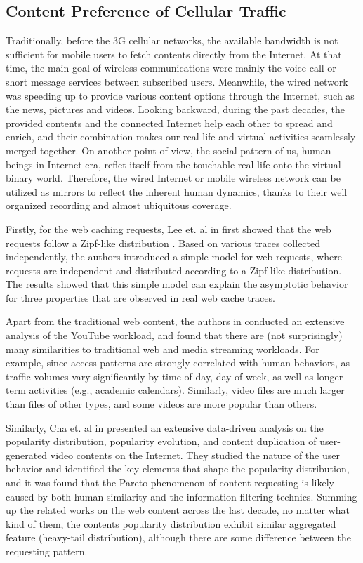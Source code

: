 \subsection{Content Preference of Cellular Traffic}
Traditionally, before the 3G cellular networks, the available bandwidth is not sufficient for mobile users to fetch contents directly from the Internet. At that time, the main goal of wireless communications were mainly the voice call or short message services between subscribed users. Meanwhile, the wired network was speeding up to provide various content options through the Internet, such as the news, pictures and videos. Looking backward, during the past decades, the provided contents and the connected Internet help each other to spread and enrich, and their combination makes our real life and virtual activities seamlessly merged together. On another point of view, the social pattern of us, human beings in Internet era, reflet itself from the touchable real life onto the virtual binary world. Therefore, the wired Internet or mobile wireless network can be utilized as mirrors to reflect the inherent human dynamics, thanks to their well organized recording and almost ubiquitous coverage.

Firstly, for the web caching requests, Lee et. al in \cite{breslau1999web} first showed that the web requests follow a Zipf-like distribution \cite{newman2005power}. Based on various traces collected independently, the authors introduced a simple model for web requests, where requests are independent and distributed according to a Zipf-like distribution. The results showed that this simple model can explain the asymptotic behavior for three properties that are observed in real web cache traces.

Apart from the traditional web content, the authors in \cite{gill2007youtube} conducted an extensive analysis of the YouTube workload, and found that there are (not surprisingly) many similarities to traditional web and media streaming workloads. For example, since access patterns are strongly correlated with human behaviors, as traffic volumes vary significantly by time-of-day, day-of-week, as well as longer term activities (e.g., academic calendars). Similarly, video files are much larger than files of other types, and some videos are more popular than others.

Similarly, Cha et. al in \cite{cha2007tube}  presented an extensive data-driven analysis on the popularity distribution, popularity evolution, and content duplication of user-generated video contents on the Internet. They studied the nature of the user behavior and identified the key elements that shape the popularity distribution, and it was found that the Pareto phenomenon of content requesting is likely caused by both human similarity and the information filtering technics. Summing up the related works on the web content across the last decade, no matter what kind of them, the contents popularity distribution exhibit similar aggregated feature (heavy-tail distribution), although there are some difference between the requesting pattern.

